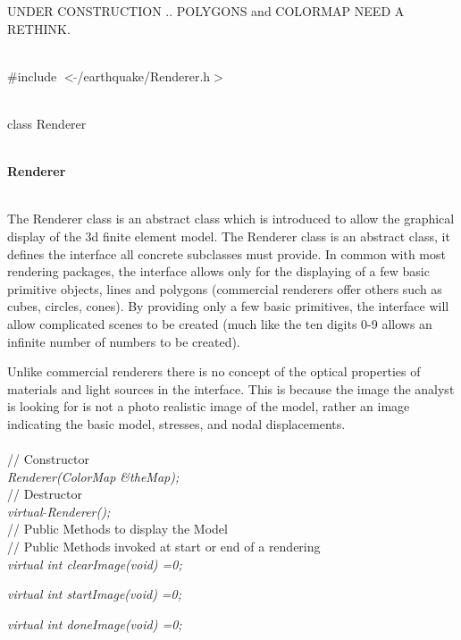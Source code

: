 
UNDER CONSTRUCTION .. POLYGONS and COLORMAP NEED A RETHINK.

   \\
\#include $<\tilde{ }$/earthquake/Renderer.h$>$  


  \\
class Renderer   


 \\
{\bf Renderer} 


 \\ 
\indent 
The Renderer class is an abstract class which is introduced to allow
the graphical display of the 3d finite element model. The Renderer class
is an abstract class, it defines the interface all concrete subclasses
must provide. In common with most rendering packages, the interface
allows only for the displaying of a few basic primitive objects, lines
and polygons (commercial renderers offer others such as cubes,
circles, cones). By providing only a few basic primitives, the
interface will allow complicated scenes to be created (much like the
ten digits 0-9 allows an infinite number of numbers to be created).

Unlike commercial renderers there is no concept of the optical
properties of materials and light sources in the interface. This is
because the image the analyst is looking for is not a photo realistic
image of the model, rather an image indicating the basic model,
stresses, and nodal displacements.   \\

 \\
\indent // Constructor \\ 
{\em Renderer(ColorMap \&theMap);}\\ 

\indent // Destructor \\ 
{\em virtual $\tilde{ }$Renderer();}\\  

\indent // Public Methods to display the Model\\ 
\indent // Public Methods invoked at start or end of a rendering\\ 
{\em virtual int clearImage(void) =0;}

{\em virtual int startImage(void) =0;}

{\em virtual int doneImage(void) =0;}\\ 

